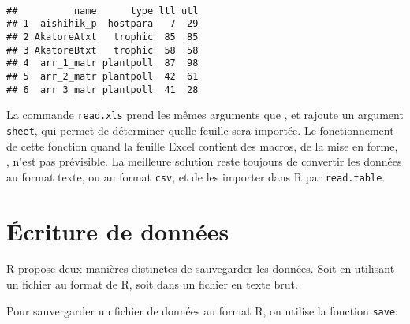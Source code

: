 \begin{knitrout}
\color{fgcolor}\begin{kframe}
\begin{flushleft}
\ttfamily\noindent
{}\hlassignement{\usebox{\hlnormalsizeboxlessthan}-}{\ }\hlkeyword{(}\hlkeyword{,}{\ }\hlargument{=}{\ }\hlkeyword{,}{\ }\hlargument{=}{\ }\hlkeyword{)}\hspace*{\fill}\\
\hlstd{}\hlkeyword{(}\hlkeyword{)}\mbox{}
\normalfont
\end{flushleft}
\begin{verbatim}
##          name      type ltl utl
## 1  aishihik_p  hostpara   7  29
## 2 AkatoreAtxt   trophic  85  85
## 3 AkatoreBtxt   trophic  58  58
## 4  arr_1_matr plantpoll  87  98
## 5  arr_2_matr plantpoll  42  61
## 6  arr_3_matr plantpoll  41  28
\end{verbatim}
\end{kframe}
\end{knitrout}


\noindent La commande \texttt{read.xls} prend les mêmes arguments que , et rajoute un argument \texttt{sheet}, qui permet de déterminer quelle feuille sera importée.
Le fonctionnement de cette fonction quand la feuille Excel contient des macros, de la mise en forme, , n'est pas prévisible.
La meilleure solution reste toujours de convertir les données au format texte, ou au format \texttt{csv}, et de les importer dans R par \texttt{read.table}. 

\section{Écriture de données}

R propose deux manières distinctes de sauvegarder les données.
Soit en utilisant un fichier au format de R, soit dans un fichier en texte brut.

Pour sauvergarder un fichier de données au format R, on utilise la fonction \texttt{save}:

\begin{knitrout}
\color{fgcolor}\begin{kframe}
\begin{flushleft}
\ttfamily\noindent
{}\hlkeyword{(}\hlkeyword{,}{\ }\hlargument{=}{\ }\hlkeyword{)}\mbox{}
\normalfont
\end{flushleft}
\end{kframe}
\end{knitrout}


